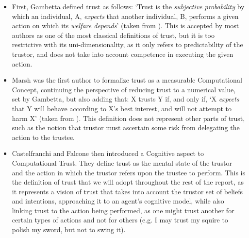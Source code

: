 \begin{itemize}
    \item First, Gambetta\cite{Gambetta1988} defined trust as follows: `Trust is the \textit{subjective probability} by which an individual, A, \textit{expects} that another individual, B, performs a given action on which its \textit{welfare depends}' (taken from \cite{Castelfranchi2010}). This is accepted by most authors as one of the most classical definitions of trust, but it is too restrictive with its uni-dimensionality, as it only refers to predictability of the trustor, and does not take into account competence in executing the given action.
    
    \item Marsh\cite{Marsh1994} was the first author to formalize trust as a measurable Computational Concept, continuing the perspective of reducing trust to a numerical value, set by Gambetta\cite{Gambetta1988}, but also adding that: X trusts Y if, and only if, `X \textit{expects} that Y will behave according to X's best interest, and will not attempt to harm X' (taken from \cite{Castelfranchi2010}). This definition does not represent other parts of trust, such as the notion that trustor must ascertain some risk from delegating the action to the trustee.
    
    \item Castelfranchi and Falcone then introduced a Cognitive aspect to Computational Trust\cite{Castelfranchi1998}. They define trust as the mental state of the trustor and the action in which the trustor refers upon the trustee to perform. This is the definition of trust that we will adopt throughout the rest of the report, as it represents a vision of trust that takes into account the trustor set of beliefs and intentions, approaching it to an agent's cognitive model, while also linking trust to the action being performed, as one might trust another for certain types of actions and not for others (e.g. I may trust my squire to polish my sword, but not to swing it).
\end{itemize}

